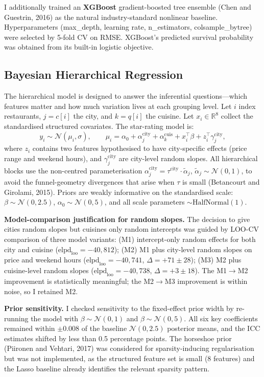 \documentclass[10pt, letterpaper]{article}
\begin{document}
I additionally trained an \textbf{XGBoost} gradient-boosted tree ensemble (Chen and Guestrin, 2016) as the natural industry-standard nonlinear baseline. Hyperparameters (max\_depth, learning rate, n\_estimators, colsample\_bytree) were selected by 5-fold CV on RMSE. XGBoost's predicted survival probability was obtained from its built-in logistic objective.

\subsection{Bayesian Hierarchical Regression}

The hierarchical model is designed to answer the inferential questions---which features matter and how much variation lives at each grouping level. Let $i$ index restaurants, $j = c[i]$ the city, and $k = q[i]$ the cuisine. Let $x_i \in \mathbb{R}^{8}$ collect the standardised structured covariates. The star-rating model is:
\[
y_i \sim \mathcal{N}(\mu_i, \sigma), \qquad \mu_i = \alpha_0 + \alpha^{\text{city}}_{j} + \alpha^{\text{cuis}}_{k} + x_i^\top \beta + z_i^\top \gamma^{\text{city}}_{j},
\]
where $z_i$ contains two features hypothesised to have city-specific effects (price range and weekend hours), and $\gamma^{\text{city}}_j$ are city-level random slopes. All hierarchical blocks use the non-centred parameterisation $\alpha^{\text{city}}_j = \tau^{\text{city}} \cdot \tilde{\alpha}_j$, $\tilde{\alpha}_j \sim \mathcal{N}(0,1)$, to avoid the funnel-geometry divergences that arise when $\tau$ is small (Betancourt and Girolami, 2015). Priors are weakly informative on the standardised scale: $\beta \sim \mathcal{N}(0, 2.5)$, $\alpha_0 \sim \mathcal{N}(0, 5)$, and all scale parameters $\sim \text{HalfNormal}(1)$.

\textbf{Model-comparison justification for random slopes.} The decision to give cities random slopes but cuisines only random intercepts was guided by LOO-CV comparison of three model variants: (M1) intercept-only random effects for both city and cuisine ($\text{elpd}_{\text{loo}} = -40{,}812$); (M2) M1 plus city-level random slopes on price and weekend hours ($\text{elpd}_{\text{loo}} = -40{,}741$, $\Delta = +71 \pm 28$); (M3) M2 plus cuisine-level random slopes ($\text{elpd}_{\text{loo}} = -40{,}738$, $\Delta = +3 \pm 18$). The M1$\to$M2 improvement is statistically meaningful; the M2$\to$M3 improvement is within noise, so I retained M2.

\textbf{Prior sensitivity.} I checked sensitivity to the fixed-effect prior width by re-running the model with $\beta \sim \mathcal{N}(0, 1)$ and $\beta \sim \mathcal{N}(0, 5)$. All six key coefficients remained within $\pm 0.008$ of the baseline $\mathcal{N}(0, 2.5)$ posterior means, and the ICC estimates shifted by less than 0.5 percentage points. The horseshoe prior (Piironen and Vehtari, 2017) was considered for sparsity-inducing regularisation but was not implemented, as the structured feature set is small (8 features) and the Lasso baseline already identifies the relevant sparsity pattern.
\end{document}
